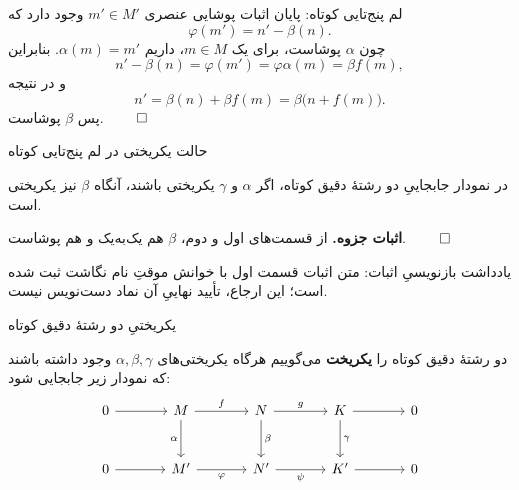 \begin{frame}[t]{لم پنج‌تایی کوتاه: پایان اثبات پوشایی}
    \label{lec16:five-surjective-end}
    عنصری \(m'\in M'\) وجود دارد که
    \[
        \varphi(m')=n'-\beta(n).
    \]
    چون \(\alpha\) پوشاست، برای یک \(m\in M\)، داریم \(\alpha(m)=m'\).
    بنابراین
    \[
        n'-\beta(n)=\varphi(m')=\varphi\alpha(m)=\beta f(m),
    \]
    و در نتیجه
    \[
        n'=\beta(n)+\beta f(m)=\beta\bigl(n+f(m)\bigr).
    \]
    پس \(\beta\) پوشاست. \hfill\(\qed\)
\end{frame}

\begin{frame}[t]{حالت یکریختی در لم پنج‌تایی کوتاه}
    \label{lec16:five-isomorphism}
    \begin{theorem}
        در نمودار جابجاییِ دو رشتهٔ دقیق کوتاه، اگر \(\alpha\) و \(\gamma\)
        یکریختی باشند، آنگاه \(\beta\) نیز یکریختی است.
    \end{theorem}
    \textbf{اثبات جزوه.} از قسمت‌های اول و دوم، \(\beta\) هم یک‌به‌یک و هم پوشاست.
    \hfill\(\qed\)
    \medskip

    \begin{alertblock}{یادداشت بازنویسیِ اثبات: }
        متن اثبات قسمت اول با خوانش موقتِ نام نگاشت ثبت شده است؛
        این ارجاع، تأیید نهاییِ آن نماد دست‌نویس نیست.
    \end{alertblock}
\end{frame}

\begin{frame}[t]{یکریختیِ دو رشتهٔ دقیق کوتاه}
    \label{lec16:equivalent-sequences}
    \begin{definition}
        دو رشتهٔ دقیق کوتاه را \textbf{یکریخت} می‌گوییم هرگاه یکریختی‌های
        \(\alpha,\beta,\gamma\) وجود داشته باشند که نمودار زیر جابجایی شود:
        \[
        \begin{tikzcd}[ampersand replacement=\&,column sep=large,row sep=large]
            0\arrow[r]\& M\arrow[r,"f"]\arrow[d,"\alpha"']
            \&N\arrow[r,"g"]\arrow[d,"\beta"]
            \&K\arrow[r]\arrow[d,"\gamma"]\&0\\
            0\arrow[r]\& M'\arrow[r,"\varphi"']
            \&N'\arrow[r,"\psi"']\&K'\arrow[r]\&0
        \end{tikzcd}
        \]
    \end{definition}
\end{frame}

